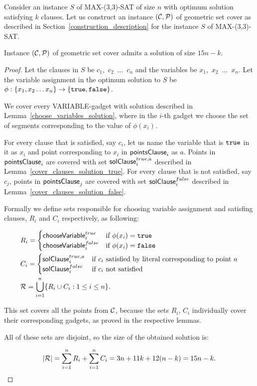 Consider an instance $S$ of MAX-(3,3)-SAT of size $n$
with optimum solution satisfying $k$ clauses.
Let us construct an instance $(\mathcal{C}, \mathcal{P})$ of geometric set cover
as described in Section~\ref{construction_description}
for the instance $S$ of MAX-(3,3)-SAT.

\begin{lemma}
	\label{construction_correctness}
	Instance $(\mathcal{C}, \mathcal{P})$ of geometric set cover
	admits a solution of size $15n - k$.
\end{lemma}

\begin{proof}
Let the clauses in $S$ be $c_1$,~$c_2$~$\ldots$~$c_n$
and the variables be $x_1$,~$x_2$~$\ldots$~$x_n$.
Let the variable assignment in
the optimum solution to $S$ be
$\phi : \{ x_1, x_2 \ldots x_n\} \rightarrow \{\texttt{true}, \texttt{false}\}$.


We cover every VARIABLE-gadget with solution described in
Lemma~\ref{choose_variables_solution}, where
in the $i$-th gadget we choose the set of segments corresponding to the
value of $\phi(x_i)$.

For every clause that is satisfied, say $c_i$, 
let us name the variable that is $\texttt{true}$ in it as $x_i$
and point corresponding to $x_i$ in $\mathsf{pointsClause}_i$ as $a$.
Points in $\mathsf{pointsClause}_i$ 
are covered with set $\mathsf{solClause}^{true,a}_i$ described in
Lemma~\ref{cover_clauses_solution_true}.
For every clause that is not satisfied, say $c_j$,
points in $\mathsf{pointsClause}_j$ are covered
with set $\mathsf{solClause}^{false}_i$ described in
Lemma~\ref{cover_clauses_solution_false}.

Formally we define 
sets responsible for choosing variable assignment and satisfing clauses,
$R_i$ and $C_i$ respectively, as following:

\begin{align}
	\begin{split}
	& R_i = \begin{cases}
		\mathsf{chooseVariable}^{true}_{i} & \text{if}\ \phi(x_i) = \texttt{true} \\
		\mathsf{chooseVariable}^{false}_{i} & \text{if}\ \phi(x_i) = \texttt{false} \\
		\end{cases} \\
	& C_i = \begin{cases}
		\mathsf{solClause}^{true,a}_i & \text{if}\ c_i \text{ satisfied by literal corresponding to point } a \\
		\mathsf{solClause}^{false}_i & \text{if}\ c_i \text{ not satisfied}
		\end{cases} \\
	& \mathcal{R} = \bigcup\limits_{i=1}^{n} \{R_i \cup C_i : 1 \le i \le n\}.
    \end{split}
\end{align}


This set covers all the points from $\mathcal{C}$, because
the sets $R_i$, $C_i$ individually cover their corresponding gadgets,
as proved in the respective lemmas.

All of these sets are disjoint, so the size of the obtained solution is:

$$|\mathcal{R}| = \sum_{i=1}^{n} R_i + \sum_{i=1}^n C_i = 3n + 11k + 12(n-k) = 15n - k.\qedhere$$
\end{proof}

